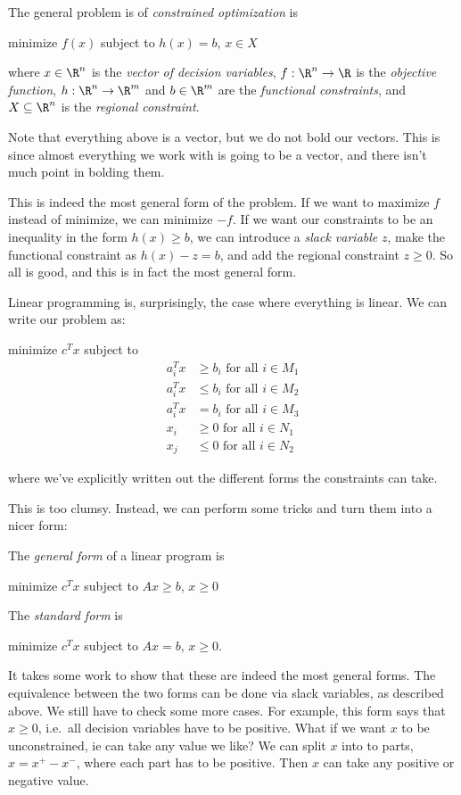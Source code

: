 \documentclass[a4paper]{article}
\begin{document}
\begin{defi}
  The general problem is of \emph{constrained optimization} is
  \begin{center}
    minimize $f(x)$ subject to $h(x) = b$, $x\in X$
  \end{center}
  where $x\in \R^n$ is the \emph{vector of decision variables}, $f: \R^n \to \R$ is the \emph{objective function}, $h: \R^n \to \R^m$ and $b\in \R^m$ are the \emph{functional constraints}, and $X\subseteq \R^n$ is the \emph{regional constraint}.
\end{defi}
Note that everything above is a vector, but we do not bold our vectors. This is since almost everything we work with is going to be a vector, and there isn't much point in bolding them.

This is indeed the most general form of the problem. If we want to maximize $f$ instead of minimize, we can minimize $-f$. If we want our constraints to be an inequality in the form $h(x) \geq b$, we can introduce a \emph{slack variable} $z$, make the functional constraint as $h(x) - z = b$, and add the regional constraint $z \geq 0$. So all is good, and this is in fact the most general form.

Linear programming is, surprisingly, the case where everything is linear. We can write our problem as:
\begin{center}
  minimize $c^Tx$ subject to
  \begin{align*}
    a_i^Tx &\geq b_i \text{ for all }i \in M_1\\
    a_i^Tx &\leq b_i \text{ for all }i \in M_2\\
    a_i^Tx &= b_i \text{ for all }i \in M_3\\
    x_i &\geq 0 \text{ for all }i \in N_1\\
    x_j &\leq 0 \text{ for all }i \in N_2
  \end{align*}
\end{center}
where we've explicitly written out the different forms the constraints can take.

This is too clumsy. Instead, we can perform some tricks and turn them into a nicer form:
\begin{defi}
  The \emph{general form} of a linear program is
  \begin{center}
    minimize $c^T x$ subject to $Ax \geq b$, $x \geq 0$
  \end{center}
  The \emph{standard form} is
  \begin{center}
    minimize $c^T x$ subject to $Ax = b$, $x \geq 0$.
  \end{center}
\end{defi}
It takes some work to show that these are indeed the most general forms. The equivalence between the two forms can be done via slack variables, as described above. We still have to check some more cases. For example, this form says that $x \geq 0$, i.e.\ all decision variables have to be positive. What if we want $x$ to be unconstrained, ie can take any value we like? We can split $x$ into to parts, $x = x^+ - x^-$, where each part has to be positive. Then $x$ can take any positive or negative value.
\end{document}
